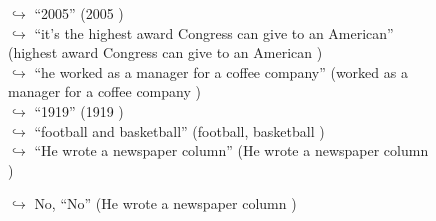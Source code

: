 \documentclass[11pt,a4paper, onecolumn]{article}
\begin{document}
\begin{figure}[t]
\begin{tcolorbox}[boxsep=0pt,left=5pt,right=0pt,top=2pt,colback = yellow!5]
\begin{dialogue}
\colorbox{pink!25}{$\hookrightarrow$}
{ ``2005'' (2005 ) }
\\
\colorbox{pink!25}{$\hookrightarrow$}
{ ``it's the highest award Congress can give to an American'' (highest award Congress can give to an American ) }
\\
\colorbox{pink!25}{$\hookrightarrow$}
{ ``he worked as a manager for a coffee company'' (worked as a manager for a coffee company ) }
\\
\colorbox{pink!25}{$\hookrightarrow$}
{ ``1919'' (1919 ) }
\\
\colorbox{pink!25}{$\hookrightarrow$}
{ ``football and basketball'' (football, basketball ) }
\\
\colorbox{pink!25}{$\hookrightarrow$}
{ ``He wrote a newspaper column'' (He wrote a newspaper column ) }
 \end{dialogue}\end{tcolorbox}\end{figure}\begin{figure}[t] \small \begin{tcolorbox}[boxsep=0pt,left=5pt,right=0pt,top=2pt,colback = yellow!5] \begin{dialogue}
 \small 
\colorbox{pink!25}{$\hookrightarrow$}
\colorbox{red!25}{No,}
{ ``No'' (He wrote a newspaper column ) }
\\
 \end{dialogue}\end{tcolorbox}\end{figure}
\end{document}
